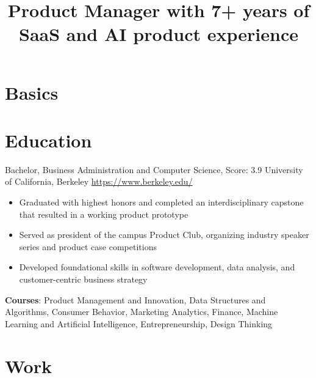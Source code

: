 \documentclass[a4paper, serif, 10pt]{moderncv}
\title{Product Manager with 7+ years of SaaS and AI product experience}
\begin{document}
\maketitle

\section{Basics}

\section{Education}

        {Bachelor, Business Administration and Computer Science, Score: 3.9}
        {University of California, Berkeley}
        {\url{https://www.berkeley.edu/}}
        {}
        {\begin{itemize}
\item Graduated with highest honors and completed an interdisciplinary capstone that resulted in a working product prototype
\item Served as president of the campus Product Club, organizing industry speaker series and product case competitions
\item Developed foundational skills in software development, data analysis, and customer-centric business strategy
\end{itemize}
\textbf{Courses}: Product Management and Innovation, Data Structures and Algorithms, Consumer Behavior, Marketing Analytics, Finance, Machine Learning and Artificial Intelligence, Entrepreneurship, Design Thinking}
\section{Work}
\end{document}
